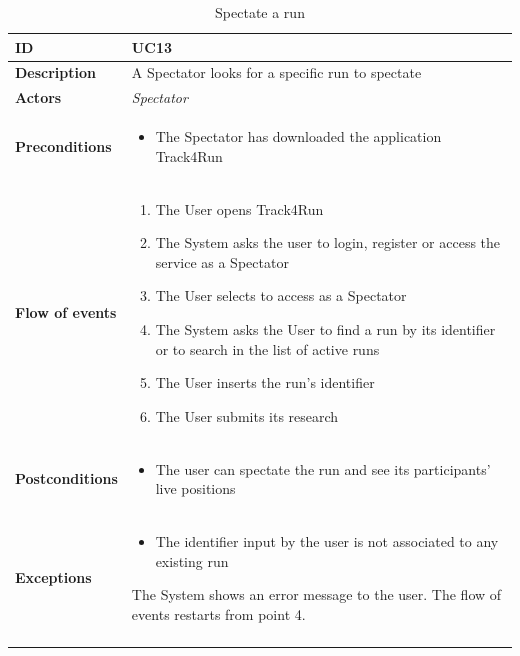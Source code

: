\documentclass[titlepage]{article}
\begin{document}
 \begin{longtable}{| p{3 cm} | p{10 cm} |} 
			\hline
			{\bf ID} & UC13\\
			\hline
			{\bf Description} & A Spectator looks for a specific run to spectate  \\
			\hline
			{\bf Actors} & {\it Spectator }\\
			\hline
			{\bf Preconditions} & 		
							\begin{itemize}
								\item The Spectator has downloaded the application Track4Run
							\end{itemize}
			\\
			\hline
			{\bf Flow of events} & 
							\begin{enumerate}
								\item The User opens Track4Run
\item The System asks the user to login, register or access the service as a Spectator
\item The User selects to access as a Spectator
\item The System asks the User to find a run by its identifier or to search in the list of active runs
\item The User inserts the run’s identifier
\item The User submits its research
							\end{enumerate}			
			 \\
			\hline
			{\bf Postconditions} & 
							\begin{itemize}
								\item The user can spectate the run and see its participants’ live positions

							\end{itemize}
			\\
			\hline
			{\bf Exceptions} & 
							\begin{itemize}
								\item The identifier input by the user is not associated to any existing run
							\end{itemize}
							The System shows an error message to the user. The flow of events restarts from point 4.					
			\\
			\hline
			\caption{Spectate a run}
			\end{longtable}

		
\end{document}
